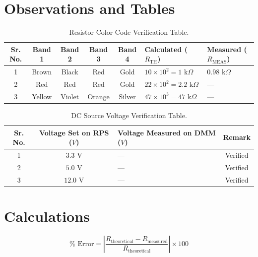 \section{Observations and Tables}

\begin{table}[htbp]
\centering
\small
\begin{tabularx}{\textwidth}{c c c c c X X}
\toprule
\textbf{Sr. No.} & \textbf{Band 1} & \textbf{Band 2} & \textbf{Band 3} & \textbf{Band 4} & \textbf{Calculated ($R_{\text{TH}}$)} & \textbf{Measured ($R_{\text{MEAS}}$)} \\
\midrule
1 & Brown & Black & Red & Gold & $10 \times 10^2 = 1\text{ k}\Omega$ & $0.98\text{ k}\Omega$ \\
2 & Red & Red & Red & Gold & $22 \times 10^2 = 2.2\text{ k}\Omega$ & — \\
3 & Yellow & Violet & Orange & Silver & $47 \times 10^3 = 47\text{ k}\Omega$ & — \\
\bottomrule
\end{tabularx}
\caption{Resistor Color Code Verification Table.}
\label{tab:res-verify}
\end{table}

\begin{table}[htbp]
\centering
\small
\begin{tabularx}{\textwidth}{c c X c}
\toprule
\textbf{Sr. No.} & \textbf{Voltage Set on RPS ($V$)} & \textbf{Voltage Measured on DMM ($V$)} & \textbf{Remark} \\
\midrule
1 & $3.3\text{ V}$ & — & Verified \\
2 & $5.0\text{ V}$ & — & Verified \\
3 & $12.0\text{ V}$ & — & Verified \\
\bottomrule
\end{tabularx}
\caption{DC Source Voltage Verification Table.}
\label{tab:dc-verify}
\end{table}

\section{Calculations}

\begin{keyequation}
\begin{equation}
    \% \text{ Error} = \left| \frac{R_{\text{theoretical}} - R_{\text{measured}}}{R_{\text{theoretical}}} \right| \times 100
\end{equation}
\end{keyequation}

